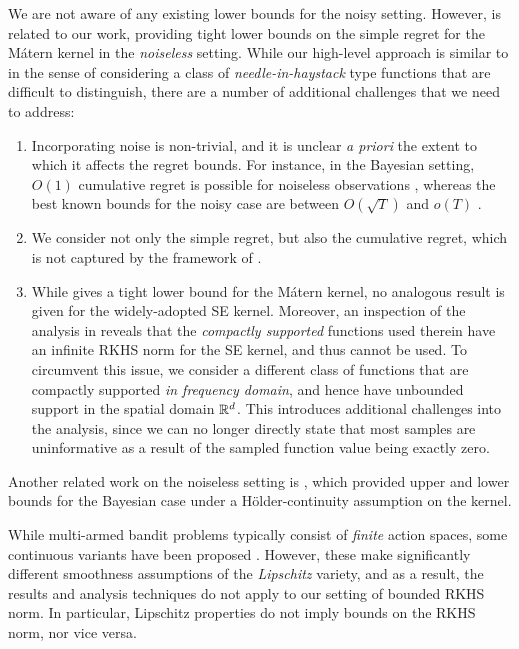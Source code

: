 \documentclass[english,onecolumn,final,11pt]{IEEEtran} %
\begin{document}
We are not aware of any existing lower bounds for the noisy setting.  However, \cite{Bul11} is related to our work, providing tight lower bounds on the simple regret for the M\'atern kernel in the {\em noiseless} setting.  While our high-level approach is similar to \cite{Bul11} in the sense of considering a class of {\em needle-in-haystack} type functions that are difficult to distinguish, there are a number of additional challenges that we need to address:
\begin{enumerate}
    \item Incorporating noise is non-trivial, and it is unclear {\em a priori} the extent to which it affects the regret bounds.  For instance, in the Bayesian setting, $O(1)$ cumulative regret is possible for noiseless observations \cite{Fre12,Kaw15}, whereas the best known bounds for the noisy case are between $O(\sqrt{T})$ and $o(T)$ \cite{Sri09}.
    \item We consider not only the simple regret, but also the cumulative regret, which is not captured by the framework of \cite{Bul11}.  %
    \item While \cite[Thm.~1]{Bul11} gives a tight lower bound for the M\'atern kernel, no analogous result is given for the widely-adopted SE kernel.  Moreover, an inspection of the analysis in \cite{Bul11} reveals that the {\em compactly supported} functions used therein have an infinite RKHS norm for the SE kernel, and thus cannot be used.  To circumvent this issue, we consider a different class of functions that are compactly supported {\em in frequency domain}, and hence have unbounded support in the spatial domain $\mathbb{R}^d$.  This introduces additional challenges into the analysis, since we can no longer directly state that most samples are uninformative as a result of the sampled function value being exactly zero.
\end{enumerate}
Another related work on the noiseless setting is  \cite{Gru10}, which provided upper and lower bounds for the Bayesian case under a H\"older-continuity assumption on the kernel.  

While multi-armed bandit problems \cite{Bub12,Aue95,Aud10} typically consist of \emph{finite} action spaces, some continuous variants have been proposed \cite{Kle04,Kle08}.  However, these make significantly different smoothness assumptions of the \emph{Lipschitz} variety, and as a result, the results and analysis techniques do not apply to our setting of bounded RKHS norm.  In particular, Lipschitz properties do not imply bounds on the RKHS norm, nor vice versa.
\end{document}
